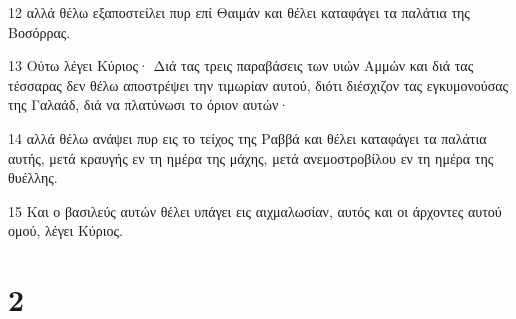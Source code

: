 \par 12 αλλά θέλω εξαποστείλει πυρ επί Θαιμάν και θέλει καταφάγει τα παλάτια της Βοσόρρας.
\par 13 Ούτω λέγει Κύριος· Διά τας τρεις παραβάσεις των υιών Αμμών και διά τας τέσσαρας δεν θέλω αποστρέψει την τιμωρίαν αυτού, διότι διέσχιζον τας εγκυμονούσας της Γαλαάδ, διά να πλατύνωσι το όριον αυτών·
\par 14 αλλά θέλω ανάψει πυρ εις το τείχος της Ραββά και θέλει καταφάγει τα παλάτια αυτής, μετά κραυγής εν τη ημέρα της μάχης, μετά ανεμοστροβίλου εν τη ημέρα της θυέλλης.
\par 15 Και ο βασιλεύς αυτών θέλει υπάγει εις αιχμαλωσίαν, αυτός και οι άρχοντες αυτού ομού, λέγει Κύριος.

\chapter{2}

